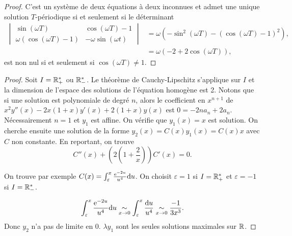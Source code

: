 \documentclass[12pt]{article}
\begin{document}
\begin{proof}
	C'est un système de deux équations à deux inconnues et admet une unique solution $T$-périodique si et seulement si le déterminant 
	\begin{align*}
		\begin{vmatrix}
			\sin(\omega T)&\cos(\omega T)-1\\
			\omega(\cos(\omega T)-1)& -\omega\sin(\omega t)
		\end{vmatrix}
		&=\omega\left(-\sin^{2}(\omega T)-\left(\cos(\omega T)-1\right)^{2}\right),\\
		&=\omega\left(-2+2\cos(\omega T)\right),
	\end{align*}
	est non nul si et seulement si $\cos(\omega T)\neq1$.
\end{proof}

\begin{proof}
	Soit $I=\mathbb{R}_{+}^{*}$ ou $\mathbb{R}_{-}^{*}$. Le théorème de Cauchy-Lipschitz s'applique sur $I$ et la dimension de l'espace des solutions de l'équation homogène est 2. Notons que si une solution est polynomiale de degré $n$, alors le coefficient en $x^{n+1}$ de $x^{2}y''(x)-2x(1+x)y'(x)+2(1+x)y(x)$ est $0=-2na_n+2a_n$. Nécessairement $n=1$ et $y_1$ est affine. On vérifie que $y_1(x)=x$ est solution. On cherche ensuite une solution de la forme $y_2(x)=C(x)y_1(x)=C(x)x$ avec $C$ non constante. En reportant, on trouve 
	\begin{equation*}
		C''(x)+\left(2\left(1+\frac{2}{x}\right)\right)C'(x)=0.
	\end{equation*}

	On trouve par exemple $C(x)=\int_{\varepsilon}^{x}\frac{\mathrm{e}^{-2 u}}{u^{4}}\mathrm{d} u$. On choisit $\varepsilon=1$ si $I=\mathbb{R}_{+}^{*}$ et $\varepsilon=-1$ si $I=\mathbb{R}_{-}^{*}$.

	\begin{equation*}
		\int_{\varepsilon}^{x}\frac{\mathrm{e}^{-2u}}{u^{4}}\mathrm{d} u\underset{x\to0}{\sim}\int_{\varepsilon}^{x}\frac{\mathrm{d} u}{u^{4}}\underset{x\to0}{\sim}\frac{-1}{3x^{3}}.
	\end{equation*}
	Donc $y_2$ n'a pas de limite en 0. $\lambda y_1$ sont les seules solutions maximales sur $\mathbb{R}$.
\end{proof}
\end{document}
